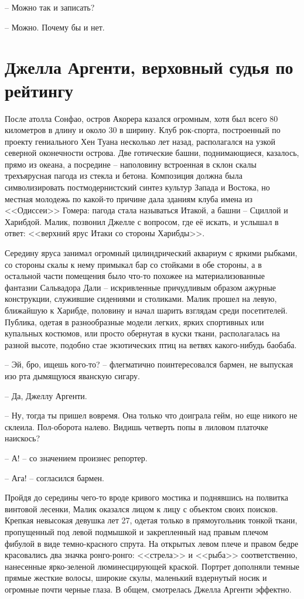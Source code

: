 -- Можно так и записать?

-- Можно. Почему бы и нет.

\chapter{Джелла Аргенти, верховный судья по рейтингу}

После атолла Сонфао, остров Акорера казался огромным, хотя был всего 80 километров в длину и около 30 в ширину. Клуб рок-спорта, построенный по проекту гениального Хен Туана несколько лет назад, располагался на узкой северной оконечности острова. Две готические башни, поднимающиеся, казалось, прямо из океана, а посредине -- наполовину встроенная в склон скалы трехъярусная пагода из стекла и бетона. Композиция должна была символизировать постмодернистский синтез культур Запада и Востока, но местная молодежь по какой-то причине дала зданиям клуба имена из <<Одиссеи>> Гомера: пагода стала называться Итакой, а башни -- Сциллой и Харибдой. Малик, позвонил Джелле с вопросом, где её искать, и услышал в ответ: <<верхний ярус Итаки со стороны Харибды>>.

Середину яруса занимал огромный цилиндрический аквариум с яркими рыбками, со стороны скалы к нему примыкал бар со стойками в обе стороны, а в остальной части помещения было что-то похожее на материализованные фантазии Сальвадора Дали -- искривленные причудливым образом ажурные конструкции, служившие сидениями и столиками. Малик прошел на левую, ближайшую к Харибде, половину и начал шарить взглядам среди посетителей. Публика, одетая в разнообразные модели легких, ярких спортивных или купальных костюмов, или просто обернутая в куски ткани, располагалась на разной высоте, подобно стае экзотических птиц на ветвях какого-нибудь баобаба.

-- Эй, бро, ищешь кого-то? -- флегматично поинтересовался бармен, не выпуская изо рта дымящуюся яванскую сигару.

-- Да, Джеллу Аргенти.

-- Ну, тогда ты пришел вовремя. Она только что доиграла гейм, но еще никого не склеила. Пол-оборота налево. Видишь четверть попы в лиловом платочке наискось?

-- А! -- со значением произнес репортер.

-- Ага! -- согласился бармен.

Пройдя до середины чего-то вроде кривого мостика и поднявшись на полвитка винтовой лесенки, Малик оказался лицом к лицу с объектом своих поисков. Крепкая невысокая девушка лет 27, одетая только в прямоугольник тонкой ткани, пропущенный под левой подмышкой и закрепленный над правым плечом фибулой в виде темно-красного спрута. На открытых левом плече и правом бедре красовались два значка ронго-ронго: <<стрела>> и <<рыба>> соответственно, нанесенные ярко-зеленой люминесцирующей краской. Портрет дополняли темные прямые жесткие волосы, широкие скулы, маленький вздернутый носик и огромные почти черные глаза. В общем, смотрелась Джелла Аргенти эффектно.

